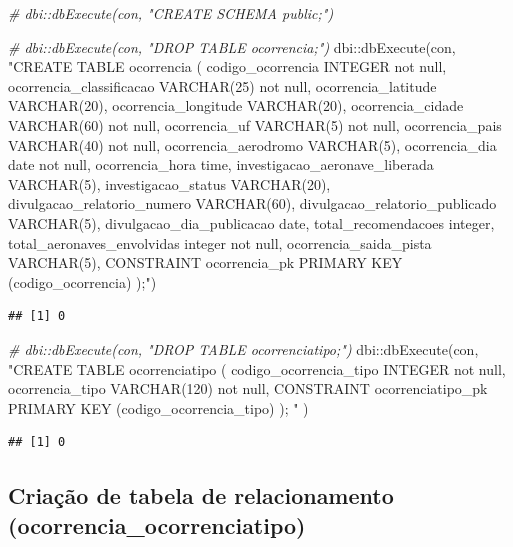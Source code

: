 \documentclass[
]{article}
\newenvironment{Shaded}{\begin{snugshade}}{\end{snugshade}}
\newcommand{\CommentTok}[1]{\textcolor[rgb]{0.56,0.35,0.01}{\textit{#1}}}
\newcommand{\FunctionTok}[1]{\textcolor[rgb]{0.00,0.00,0.00}{#1}}
\newcommand{\NormalTok}[1]{#1}
\newcommand{\SpecialCharTok}[1]{\textcolor[rgb]{0.00,0.00,0.00}{#1}}
\newcommand{\StringTok}[1]{\textcolor[rgb]{0.31,0.60,0.02}{#1}}
\begin{document}
\begin{Shaded}
\begin{Highlighting}[]
\CommentTok{\# dbi::dbExecute(con, "CREATE SCHEMA public;")}

\CommentTok{\# dbi::dbExecute(con, "DROP TABLE ocorrencia;")}
\NormalTok{dbi}\SpecialCharTok{::}\FunctionTok{dbExecute}\NormalTok{(con, }\StringTok{"CREATE TABLE ocorrencia (}
\StringTok{  codigo\_ocorrencia INTEGER not null,}
\StringTok{  ocorrencia\_classificacao VARCHAR(25) not null,}
\StringTok{  ocorrencia\_latitude VARCHAR(20),}
\StringTok{  ocorrencia\_longitude VARCHAR(20),}
\StringTok{  ocorrencia\_cidade VARCHAR(60) not null,}
\StringTok{  ocorrencia\_uf VARCHAR(5) not null,}
\StringTok{  ocorrencia\_pais VARCHAR(40) not null,}
\StringTok{  ocorrencia\_aerodromo VARCHAR(5),}
\StringTok{  ocorrencia\_dia date not null,}
\StringTok{  ocorrencia\_hora time,}
\StringTok{  investigacao\_aeronave\_liberada VARCHAR(5),}
\StringTok{  investigacao\_status VARCHAR(20),}
\StringTok{  divulgacao\_relatorio\_numero VARCHAR(60),}
\StringTok{  divulgacao\_relatorio\_publicado VARCHAR(5),}
\StringTok{  divulgacao\_dia\_publicacao date,}
\StringTok{  total\_recomendacoes integer,}
\StringTok{  total\_aeronaves\_envolvidas integer not null,}
\StringTok{  ocorrencia\_saida\_pista VARCHAR(5),}
\StringTok{  CONSTRAINT ocorrencia\_pk PRIMARY KEY (codigo\_ocorrencia)}
\StringTok{);"}\NormalTok{)}
\end{Highlighting}
\end{Shaded}

\begin{verbatim}
## [1] 0
\end{verbatim}

\begin{Shaded}
\begin{Highlighting}[]
\CommentTok{\# dbi::dbExecute(con, "DROP TABLE ocorrenciatipo;")}
\NormalTok{dbi}\SpecialCharTok{::}\FunctionTok{dbExecute}\NormalTok{(con,}
\StringTok{"CREATE TABLE ocorrenciatipo (}
\StringTok{    codigo\_ocorrencia\_tipo INTEGER not null,}
\StringTok{    ocorrencia\_tipo VARCHAR(120) not null,}
\StringTok{    CONSTRAINT ocorrenciatipo\_pk PRIMARY KEY (codigo\_ocorrencia\_tipo)}
\StringTok{);}
\StringTok{"}
\NormalTok{)}
\end{Highlighting}
\end{Shaded}

\begin{verbatim}
## [1] 0
\end{verbatim}

\hypertarget{criauxe7uxe3o-de-tabela-de-relacionamento-ocorrencia_ocorrenciatipo}{%
\subsection{Criação de tabela de relacionamento
(ocorrencia\_ocorrenciatipo)}\label{criauxe7uxe3o-de-tabela-de-relacionamento-ocorrencia_ocorrenciatipo}}
\end{document}
